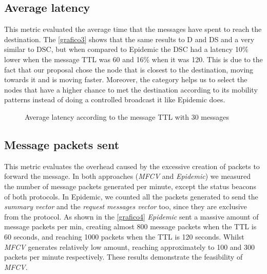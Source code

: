 \documentclass[letterpaper, 10 pt, conference]{ieeeconf}  %
\begin{document}
\subsection{Average latency}

This metric evaluated the average time that the messages have spent to reach the destination. The \autoref{grafico3} shows that the same results to D and DS and a very similar to DSC, but when compared to Epidemic the DSC had a latency 10\% lower when the message TTL was 60 and 16\% when it was 120. This is due to the fact that our proposal chose the node that is closest to the destination, moving towards it and is moving faster. Moreover, the category helps us to select the nodes that have a higher chance to met the destination according to its mobility patterns instead of doing a controlled broadcast it like Epidemic does.

\begin{figure}[thpb]
    \center
    \caption{Average latency according to the message TTL with 30 messages} \label{grafico3}
\end{figure}

\subsection{Message packets sent}

This metric evaluates the overhead caused by the excessive creation of packets to forward the message. In both approaches (\emph{MFCV} and \emph{Epidemic}) we measured the number of message packets generated per minute, except the status beacons of both protocols. In Epidemic, we counted all the packets generated to send the \emph{summary vector} and the \emph{request messages vector} too, since they are exclusive from the protocol. As shown in the \autoref{grafico4} \emph{Epidemic} sent a massive amount of message packets per min, creating almost 800 message packets when the TTL is 60 seconds, and reaching 1000 packets when the TTL is 120 seconds. Whilst \emph{MFCV} generates relatively low amount, reaching approximately to 100 and 300 packets per minute respectively. These results demonstrate the feasibility of \emph{MFCV}.
\end{document}
